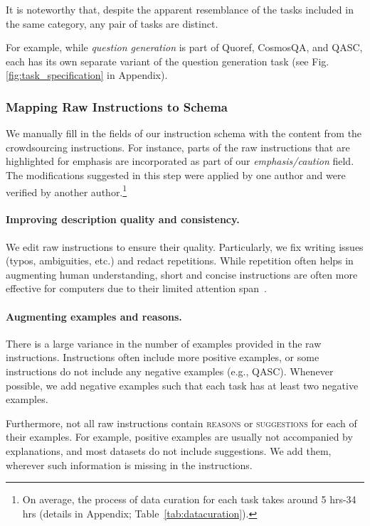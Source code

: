 It is noteworthy that, despite the apparent resemblance of the tasks included in the same category, any pair of tasks are distinct. 

For example, while \emph{question generation} is part of Quoref, CosmosQA, and QASC, each has its own separate variant of the question generation task (see Fig.\ref{fig:task_specification} in Appendix). 

\subsubsection{Mapping Raw Instructions to Schema } 
\label{subsec:maptoschema}
     We manually fill in the fields of our instruction schema  with the content from the crowdsourcing instructions. For instance, parts of the raw instructions that are highlighted for emphasis are incorporated as part of our \emph{emphasis/caution} field. The modifications suggested in this step were applied by one author and were verified by another author.\footnote{On average, the process of data curation for each task takes around 5 hrs-34 hrs (details in Appendix; Table~\ref{tab:datacuration}).} 

\paragraph{Improving description quality and consistency.} We edit raw instructions to ensure their quality. Particularly, we fix  writing issues (typos, ambiguities, etc.) and  redact repetitions. While repetition often helps in augmenting human understanding, short and concise instructions are often more effective for computers due to their limited attention span~\cite{beltagy2020longformer}. 

\paragraph{Augmenting examples and reasons.}

 There is a large variance in the number of examples provided in the raw instructions. Instructions often include more positive examples, or some instructions do not include any negative examples (e.g., QASC). Whenever possible, we add negative examples such that each task has at least two negative examples. 

Furthermore, not  all raw instructions contain \textsc{reasons} or \textsc{suggestions} for each of their examples. For example, positive examples are usually not accompanied by explanations, and most datasets do not include suggestions. We add them, wherever such information is missing in the instructions. 

